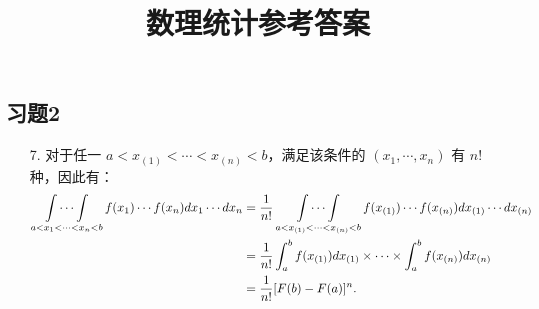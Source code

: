\documentclass{article}
\title{\textbf{数理统计参考答案}}
\author{}
\date{}
\begin{document}
\begin{CJK}{UTF8}{gbsn}
    \maketitle

    \section{习题2}
    \begin{itemize}
        \item [7.] 对于任一 $a<x_{(1)} <\cdots <x_{(n)}<b$，满足该条件的 $(x_1,\cdots, x_n)$ 有 $n!$
              种，因此有：
              \begin{align}
                  \mathop{\int \cdots \int}_{a<x_1 <\cdots <x_n<b} f(x_1) \cdots f(x_n) dx_1\cdots dx_n & =
                  \frac{1}{n!} \mathop{\int \cdots \int}_{a<x_{(1)} <\cdots <x_{(n)}<b}f(x_{(1)}) \cdots f(x_{(n)}) dx_{(1)}\cdots dx_{(n)} \notag                                                     \\
                                                                                                        & =\frac{1}{n!}\int_a^bf(x_{(1)})dx_{(1)}\times \cdots \times \int_a^bf(x_{(n)})dx_{(n)}\notag \\
                                                                                                        & =\frac{1}{n!}[F(b)-F(a)]^n.\notag
              \end{align}
    \end{itemize}

\end{CJK}
\end{document}

